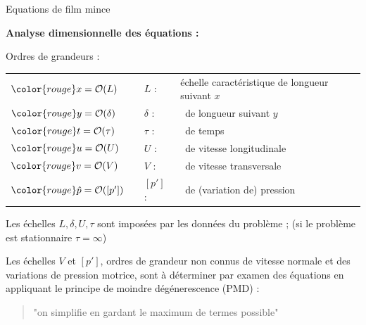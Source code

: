 \begin{frame}{Equations de film mince}

\small

\textbf{Analyse dimensionnelle des équations :} \medskip

Ordres de grandeurs : 



\begin{center}
	\begin{tabular}{lp{3mm}ll}
		$\color{rouge} x = {\mathcal O} (L)$  & & $L$ :  &  échelle caractéristique de longueur suivant $x$
		\\
		$\color{rouge} y =  {\mathcal O} (\delta)$ &  & $\delta$ : & \dotfill\ de longueur suivant $y$
		\\
		$\color{rouge} t =  {\mathcal O} (\tau)$ &  & $\tau$ : & \dotfill\ de temps 		\\
		$\color{rouge} u =  {\mathcal O} (U)$ &  & $U$ : & \dotfill\ de vitesse longitudinale
		\\
		$\color{rouge} v =  {\mathcal O} (V)$ &  & $V$ : & \dotfill\ de vitesse transversale
		\\
		$\color{rouge} \hat{p} =  {\mathcal O} ([p'])$ &  & $[p']$ : & \dotfill\ de (variation de) pression
		
	\end{tabular}
\end{center} 


\smallskip

Les échelles $L,\delta,U,\tau$ sont imposées par les données du problème ; {\tiny (si le problème est stationnaire $\tau=\infty$)}

\smallskip

Les échelles $V$ et $[p']$, ordres de grandeur non connus de vitesse normale et des variations de pression motrice, sont à déterminer par examen des équations en appliquant le principe de moindre dégénerescence (PMD) :

\smallskip

\begin{quotation}
"on simplifie en gardant le maximum de termes possible"
\end{quotation}

\small


\end{frame}

